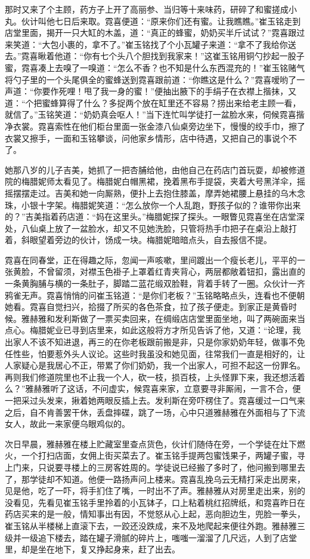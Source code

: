 \par 那时又来了个主顾，药方子上开了高丽参、当归等十来味药，研碎了和蜜搓成小丸。伙计叫他七日后来取。霓喜便道：“原来你们还有蜜。让我瞧瞧。”崔玉铭走到店堂里面，揭开一只大缸的木盖，道：“真正的蜂蜜，奶奶买半斤试试？”霓喜跟过来笑道：“大包小裹的，拿不了。”崔玉铭找了个小瓦罐子来道：“拿不了我给你送去。”霓喜瞅着他道：“你有七个头八个胆找到我家来！”这崔玉铭用铜勺抄起一股子蜜，霓喜凑上去嗅了一嗅道：“怎么不香？也不知是什么东西混充的！”崔玉铭赌气将勺子里的一个头尾俱全的蜜蜂送到霓喜跟前道：“你瞧这是什么？”霓喜嗳哟了一声道：“你要作死哩！甩了我一身的蜜！”便抽出腋下的手绢子在衣襟上揩抹，又道：“个把蜜蜂算得了什么？多捉两个放在缸里还不容易？捞出来给老主顾一看，就信了。”玉铭笑道：“奶奶真会呕人！”当下连忙叫学徒打一盆脸水来，伺候霓喜揩净衣裳。霓喜索性在他们柜台里面一张金漆八仙桌旁边坐下，慢慢的绞手巾，擦了衣裳又擦手，一面和玉铭攀谈，问他家乡情形，店中待遇，又把自己的事说个不了。
\par 她那八岁的儿子吉美，她抓了一把杏脯给他，由他自己在药店门首玩耍，却被修道院的梅腊妮师太看见了。梅腊妮白帽黑裙，挽着黑布手提袋，夹着大号黑洋伞，摇摇摆摆走过。吉美和她一向厮熟，便扑上去抱住膝盖，摩弄她裙腰上悬挂的乌木念珠，小银十字架。梅腊妮笑道：“怎么放你一个人乱跑，野孩子似的？谁带你出来的？”吉美指着药店道：“妈在这里头。”梅腊妮探了探头。一眼瞥见霓喜坐在店堂深处，八仙桌上放了一盆脸水，却又不见她洗脸，只管将热手巾把子在桌沿上敲打着，斜眼望着旁边的伙计，饧成一块。梅腊妮暗暗点头，自去报信不提。
\par 霓喜在同春堂，正在得趣之际，忽闻一声咳嗽，里间踱出一个瘦长老儿，平平的一张黄脸，不曾留须，对襟玉色褂子上罩着红青夹背心，两层都敞着钮扣，露出直的一条黄胸脯与横的一条肚子，脚踏二蓝花缎双脸鞋，背着手转了一圈。众伙计一齐鸦雀无声。霓喜悄悄的问崔玉铭道：“是你们老板？”玉铭略略点头，连看也不便朝她看。霓喜自觉扫兴，拾掇了所买的各色茶食，拉了孩子便走。到家正是黄昏时候。雅赫雅和发利斯做了一票买卖回来，在绸缎店店堂里面坐地，叫了两碗面来当点心。梅腊妮业已寻到店里来，如此这般将方才所见告诉了他，又道：“论理，我出家人不该不知进退，再三的在你老板跟前搬是非，只是你家奶奶年轻，做事不免任性些，怕要惹外头人议论。这些时我虽没和她见面，往常我们一直是相好的，让人家疑心是我居心不正，带累了你们奶奶，我一个出家人，可担不起这一份罪名。再则我们修道院里也不止我一个人，砍一枝，损百枝，上头怪罪下来，我还想活着么？”雅赫雅听了这话，不问虚实，候霓喜来家，立意要寻非厮闹，一言不合，便一把采过头发来，揪着她两眼反插上去。发利斯在旁吓楞住了。霓喜缓过一口气来之后，自不肯善罢干休，丢盘摔碟，跳了一场，心中只道雅赫雅在外面相与了下流女人，故此一来家便乌眼鸡似的。
\par 次日早晨，雅赫雅在楼上贮藏室里查点货色，伙计们随侍在旁，一个学徒在灶下燃火，一个打扫店面，女佣上街买菜去了。崔玉铭手提两包蜜饯果子，两罐子蜜，寻上门来，只说要寻楼上的三房客姓周的。学徒说已经搬了多时了，他问搬到哪里去了，那学徒却不知道。他便一路扬声问上楼来。霓喜乱挽乌云无精打采走出房来，见是他，吃了一吓，将手扪住了嘴，一时出不了声。雅赫雅从对房里走出来，别的没看见，先看见崔玉铭手里拎着的小瓦钵子，口上粘着桃红招牌纸，和霓喜昨日在药店买来的是一般，情知事出有因，不觉怒从心上起，恶向胆边生，兜脸一拳头，崔玉铭从半楼梯上直滚下去，一跤还没跌成，来不及地爬起来便往外跑。雅赫雅三级并一级追下楼去，踏在罐子滑腻的碎片上，嗤嗤一溜溜了几尺远，人到了店堂里，却是坐在地下，复又挣起身来，赶了出去。
